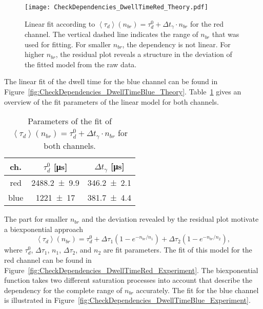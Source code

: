 \begin{figure}[h]
	\centering
	\texttt{[image: CheckDependencies\_DwellTimeRed\_Theory.pdf]}
	\caption[Linear fit of dwell time for red channel]{Linear fit according to $\left\langle \tau_d \right\rangle (n_{br}) =  \tau_d^0 + \Delta t_{\gamma} \cdot n_{br}$ for the red channel. The vertical dashed line indicates the range of $n_{br}$ that was used for fitting. For smaller $n_{br}$, the dependency is not linear. For higher $n_{br}$, the residual plot reveals a structure in the deviation of the fitted model from the raw data.}
	\label{fig:CheckDependencies_DwellTimeRed_Theory}
\end{figure}

The linear fit of the dwell time for the blue channel can be found in Figure~\ref{fig:CheckDependencies_DwellTimeBlue_Theory}. Table~\ref{Table:DwellTimeTheory} gives an overview of the fit parameters of the linear model for both channels.

\clearpage

\begin{table}[h!]
	\centering
	\begin{tabular}{c|c|c} 
		ch. & $ \tau_d^0$ [\si{\micro\second}] & $\Delta t_{\gamma}$ [\si{\micro\second}]  \\
		\hline
		red & \num{2488.2 +- 9.9} & \num{346.2 +- 2.1} \\
		blue & \num{1221 +- 17} & \num{381.7 +- 4.4} \\
	\end{tabular}
	\caption[Parameters of linear fit of dwell time]{Parameters of the fit of $\left\langle \tau_d \right\rangle (n_{br}) = \tau_d^0 + \Delta t_{\gamma} \cdot n_{br}$ for both channels.}
	\label{Table:DwellTimeTheory}
\end{table}

The part for smaller $n_{br}$ and the deviation revealed by the residual plot motivate a biexponential approach
\begin{equation}
	\left\langle \tau_d \right\rangle (n_{br}) = \tau_d^0 + \Delta \tau_1 (1 - e^{-n_{br}/ n_1}) + \Delta \tau_2 (1 - e^{-n_{br}/ n_2}),
\end{equation}
where $\tau_d^0$, $\Delta \tau_1$, $n_1$, $\Delta \tau_2$, and $n_2$ are fit parameters. The fit of this model for the red channel can be found in Figure~\ref{fig:CheckDependencies_DwellTimeRed_Experiment}. The biexponential function takes two different saturation processes into account that describe the dependency for the complete range of $n_{br}$ accurately. The fit for the blue channel is illustrated in Figure~\ref{fig:CheckDependencies_DwellTimeBlue_Experiment}.

